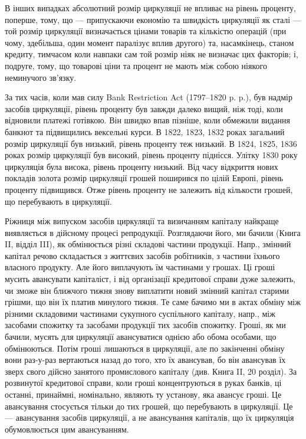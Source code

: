 
В інших випадках абсолютний розмір циркуляції не впливає на рівень
проценту, поперше, тому, що — припускаючи економію та швидкість циркуляції
як сталі — той розмір циркуляції визначається цінами товарів та кількістю операцій
(при чому, здебільша, один момент паралізує вплив другого) та, насамкінець,
станом кредиту, тимчасом коли навпаки сам той розмір ніяк не визначає
цих факторів; і, подруге, тому, що товарові ціни та процент не мають між собою
ніякого неминучого зв’язку.

За тих часів, коли мав силу Bank Restriction Act (1797--1820 p. p.),
був надмір засобів циркуляції, рівень проценту був завжди далеко вищий, ніж
тоді, коли відновили платежі готівкою. Він швидко впав пізніше, коли обмежили
видання банкнот та підвищились вексельні курси. В 1822, 1823, 1832 роках
загальний розмір циркуляції був низький, рівень проценту теж низький. В 1824,
1825, 1836 роках розмір циркуляції був високий, рівень проценту піднісся.
Улітку 1830 року циркуляція була висока, рівень проценту низький. Від часу
відкриття нових покладів золота розмір циркуляції грошей поширився по цілій
Европі, рівень проценту підвищився. Отже рівень проценту не залежить від
кількости грошей, що перебувають в циркуляції.

Ріжниця між випуском засобів циркуляції та визичанням капіталу найкраще
виявляється в дійсному процесі репродукції. Розглядаючи його, ми бачили (Книга II,
відділ III), як обмінюється різні складові частини продукції. Напр., змінний капітал
речово складається з життєвих засобів робітників, з частини їхнього власного
продукту. Але його виплачують їм частинами у грошах. Ці гроші мусить
авансувати капіталіст, і від організації кредитової справи дуже залежить, чи
зможе він ближчого тижня знову виплатити новий змінний капітал старими
грішми, що він їх платив минулого тижня. Те саме бачимо ми в актах обміну
між різними складовими частинами сукупного суспільного капіталу, напр., між
засобами спожитку та засобами продукції тих засобів спожитку. Гроші, як ми
бачили, мусять для циркуляції авансуватися однією або обома особами, що обмінюються.
Потім гроші лишаються в циркуляції, але по закінченні обміну вони
раз-у-раз вертаються назад до того, хто їх авансував, бо він авансував їх зверх
свого дійсно занятого промислового капіталу (див. Книга II, 20 розділ). За розвинутої
кредитової справи, коли гроші концентруються в руках банків, ці останні,
принаймні, номінально, являють ту установу, яка авансує гроші. Це авансування
стосується тільки до тих грошей, що перебувають в циркуляції. Це — авансування
засобів циркуляції, а не авансування капіталів, що їх циркуляція обумовлюється
цим авансуванням.

